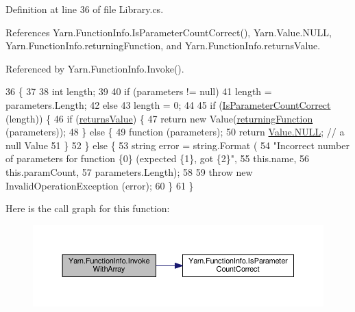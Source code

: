 Definition at line 36 of file Library.\-cs.



References Yarn.\-Function\-Info.\-Is\-Parameter\-Count\-Correct(), Yarn.\-Value.\-N\-U\-L\-L, Yarn.\-Function\-Info.\-returning\-Function, and Yarn.\-Function\-Info.\-returns\-Value.



Referenced by Yarn.\-Function\-Info.\-Invoke().


\begin{DoxyCode}
36                                                          \{
37 
38             \textcolor{keywordtype}{int} length;
39 
40             \textcolor{keywordflow}{if} (parameters != null)
41                 length = parameters.Length;
42             \textcolor{keywordflow}{else}
43                 length = 0;
44 
45             \textcolor{keywordflow}{if} (\hyperlink{a00100_a1ed09ff8aafa230a0d2bbc23cd6cd763}{IsParameterCountCorrect} (length)) \{
46                 \textcolor{keywordflow}{if} (\hyperlink{a00100_acaff044276aa230de7c0b27dd5267bc7}{returnsValue}) \{
47                     \textcolor{keywordflow}{return} \textcolor{keyword}{new} Value(\hyperlink{a00100_a8b6e0e5a875c427a1d947f3c52c308ca}{returningFunction} (parameters));
48                 \} \textcolor{keywordflow}{else} \{
49                     \textcolor{keyword}{function} (parameters);
50                     \textcolor{keywordflow}{return} \hyperlink{a00181_a1ed2964965baca8621c45efa23f37660}{Value.NULL}; \textcolor{comment}{// a null Value}
51                 \}
52             \} \textcolor{keywordflow}{else} \{
53                 \textcolor{keywordtype}{string} error = string.Format (
54                     \textcolor{stringliteral}{"Incorrect number of parameters for function \{0\} (expected \{1\}, got \{2\}"},
55                     this.name,
56                     this.paramCount,
57                     parameters.Length);
58 
59                 \textcolor{keywordflow}{throw} \textcolor{keyword}{new} InvalidOperationException (error);
60             \}
61         \}
\end{DoxyCode}


Here is the call graph for this function\-:
\nopagebreak
\begin{figure}[H]
\begin{center}
\leavevmode
\includegraphics[width=350pt]{a00100_a3ce11058d35232907a738de4bb094c67_cgraph}
\end{center}
\end{figure}




